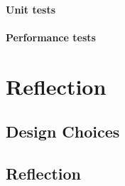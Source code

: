 \documentclass[11pt]{article}
\begin{document}
\paragraph{Unit tests} 
\paragraph{Performance tests} 




\section{Reflection}
    \subsection{Design Choices}


   \subsection{Reflection}







\end{document}
